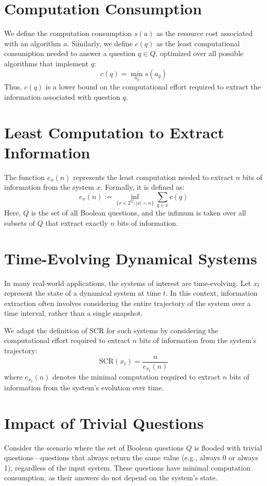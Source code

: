 \documentclass[11pt,a4paper]{article}
\theoremstyle{definition}
\theoremstyle{remark}
\numberwithin{equation}{section}
\begin{document}
\section{Computation Consumption}
We define the computation consumption \(s(a)\) as the resource cost associated with an algorithm \(a\). Similarly, we define \(c(q)\) as the least computational consumption needed to answer a question \(q \in Q\), optimized over all possible algorithms that implement \(q\):
\[
c(q) = \min_{a_q} s(a_q)
\]
Thus, \(c(q)\) is a lower bound on the computational effort required to extract the information associated with question \(q\).

\section{Least Computation to Extract Information}
The function \(e_x(n)\) represents the least computation needed to extract \(n\) bits of information from the system \(x\). Formally, it is defined as:
\[
e_x(n) := \inf_{\{x \in 2^Q : |x|=n\}} \sum_{q \in x} c(q)
\]
Here, \(Q\) is the set of all Boolean questions, and the infimum is taken over all subsets of \(Q\) that extract exactly \(n\) bits of information.

\section{Time-Evolving Dynamical Systems}
In many real-world applications, the systems of interest are time-evolving. Let \(x_t\) represent the state of a dynamical system at time \(t\). In this context, information extraction often involves considering the entire trajectory of the system over a time interval, rather than a single snapshot.

We adapt the definition of SCR for such systems by considering the computational effort required to extract \(n\) bits of information from the system's trajectory:
\[
\text{SCR}(x_t) = \frac{n}{e_{x_t}(n)}
\]
where \(e_{x_t}(n)\) denotes the minimal computation required to extract \(n\) bits of information from the system's evolution over time.

\section{Impact of Trivial Questions}
Consider the scenario where the set of Boolean questions \(Q\) is flooded with trivial questions—questions that always return the same value (e.g., always 0 or always 1), regardless of the input system. These questions have minimal computation consumption, as their answers do not depend on the system's state.
\end{document}
